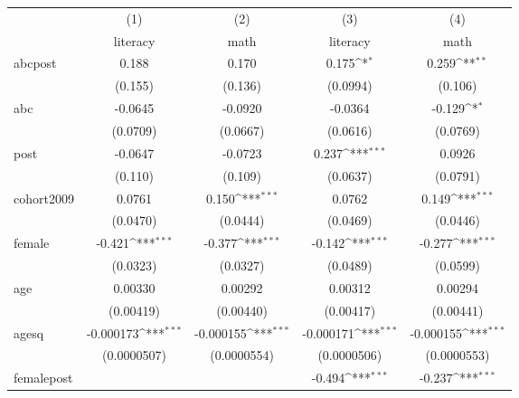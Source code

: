 {
\def\sym#1{\ifmmode^{#1}\else\(^{#1}\)\fi}
\begin{tabular}{l*{4}{c}}
\toprule
            &\multicolumn{1}{c}{(1)}&\multicolumn{1}{c}{(2)}&\multicolumn{1}{c}{(3)}&\multicolumn{1}{c}{(4)}\\
            &\multicolumn{1}{c}{literacy}&\multicolumn{1}{c}{math}&\multicolumn{1}{c}{literacy}&\multicolumn{1}{c}{math}\\
\midrule
abcpost     &       0.188         &       0.170         &       0.175\sym{*}  &       0.259\sym{**} \\
            &     (0.155)         &     (0.136)         &    (0.0994)         &     (0.106)         \\
\addlinespace
abc         &     -0.0645         &     -0.0920         &     -0.0364         &      -0.129\sym{*}  \\
            &    (0.0709)         &    (0.0667)         &    (0.0616)         &    (0.0769)         \\
\addlinespace
post        &     -0.0647         &     -0.0723         &       0.237\sym{***}&      0.0926         \\
            &     (0.110)         &     (0.109)         &    (0.0637)         &    (0.0791)         \\
\addlinespace
cohort2009  &      0.0761         &       0.150\sym{***}&      0.0762         &       0.149\sym{***}\\
            &    (0.0470)         &    (0.0444)         &    (0.0469)         &    (0.0446)         \\
\addlinespace
female      &      -0.421\sym{***}&      -0.377\sym{***}&      -0.142\sym{***}&      -0.277\sym{***}\\
            &    (0.0323)         &    (0.0327)         &    (0.0489)         &    (0.0599)         \\
\addlinespace
age         &     0.00330         &     0.00292         &     0.00312         &     0.00294         \\
            &   (0.00419)         &   (0.00440)         &   (0.00417)         &   (0.00441)         \\
\addlinespace
agesq       &   -0.000173\sym{***}&   -0.000155\sym{***}&   -0.000171\sym{***}&   -0.000155\sym{***}\\
            & (0.0000507)         & (0.0000554)         & (0.0000506)         & (0.0000553)         \\
\addlinespace
femalepost  &                     &                     &      -0.494\sym{***}&      -0.237\sym{***}\\

\end{tabular}}
